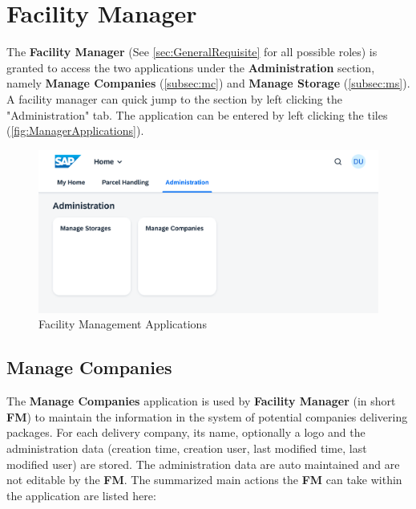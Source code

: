 \pagebreak

\section{Facility Manager}
\label{sec:UdocFacilityManager}

The \textbf{Facility Manager} (See \autoref{sec:GeneralRequisite} for all possible roles) is granted to access the two applications under the \textbf{Administration} section, namely \textbf{Manage Companies} (\autoref{subsec:mc}) and \textbf{Manage Storage} (\autoref{subsec:ms}). 
A facility manager can quick jump to the section by left clicking the "Administration" tab. The application can be entered by left clicking the tiles (\autoref{fig:ManagerApplications}).

\begin{figure}[H]
	\centering
	\includegraphics[width=1\linewidth]{images/user_doc/overviews/AdminTab.png}
	\caption{Facility Management Applications}
	\label{fig:ManagerApplications}
\end{figure}


\subsection{Manage Companies}
\label{subsec:mc}

The \textbf{Manage Companies} application is used by \textbf{Facility Manager} (in short \textbf{FM}) to maintain the information in the system of potential companies delivering packages. For each delivery company, its name, optionally a logo and the administration data (creation time, creation user, last modified time, last modified user) are stored. The administration data are auto maintained and are not editable by the \textbf{FM}. The summarized main actions the \textbf{FM} can take within the application are listed here:

